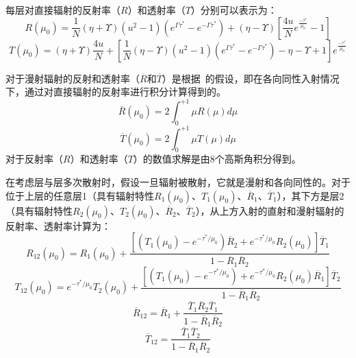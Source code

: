 每层对直接辐射的反射率（$R$）和透射率（$T$）分别可以表示为：
\begin{equation}
R\left( \mu_{0} \right) = \frac{1}{N}(\eta + \Upsilon)\left( u^{2} - 1 \right)\left( e^{\Gamma\tau^{*}} - e^{- \Gamma\tau^{*}} \right) + (\eta - \Upsilon)\left\lbrack \frac{4u}{N}e^{\frac{- \tau^{*}}{\mu_{0}}} - 1 \right\rbrack
\end{equation}
\begin{equation}
T\left( \mu_{0} \right) = (\eta + \Upsilon)\frac{4u}{N} + \left\lbrack \frac{1}{N}(\eta - \Upsilon)\left( u^{2} - 1 \right)\left( e^{\Gamma\tau^{*}} - e^{- \Gamma\tau^{*}} \right) - \eta - \Upsilon + 1 \right\rbrack e^{\frac{- \tau^{*}}{\mu_{0}}}
\end{equation}

对于漫射辐射的反射和透射率（\(\overline{R}\)和\(\overline{T}\)）是根据~\citet{wiscombe1980ModelSpectralAlbedo}的假设，即在各向同性入射情况下，通过对直接辐射的反射率进行积分计算得到的。
%
\begin{equation}
\overline{R}\left( \mu_{0} \right) = 2\int_{0}^{+ 1}{\mu R(\mu)d\mu}
\end{equation}
\begin{equation}
\overline{T}\left( \mu_{0} \right) = 2\int_{0}^{+ 1}{\mu T(\mu)d\mu}
\end{equation}
%
对于反射率（$R$）和透射率（$T$）的数值求解是由8个高斯角积分得到。

在考虑层与层多次散射时，假设一旦辐射被散射，它就是漫射和各向同性的。对于位于上层的任意层1（具有辐射特性\(R_{1}\left( \mu_{0} \right)\)、\(T_{1}\left( \mu_{0} \right)\)、\({\overline{R}}_{1}\)、\({\overline{T}}_{1}\)），其下方是层2（具有辐射特性\(R_{2}\left( \mu_{0} \right)\)、\(T_{2}\left( \mu_{0} \right)\)、\({\overline{R}}_{2}\)、\({\overline{T}}_{2}\)），从上方入射的直射和漫射辐射的反射率、透射率计算为\citep{briegleb2007delta}：
\begin{equation}
R_{12}\left( \mu_{0} \right) = R_{1}\left( \mu_{0} \right) + \frac{\left\lbrack \left( T_{1}\left( \mu_{0} \right) - e^{- \tau^{*}/\mu_{0}} \right){\overline{R}}_{2} + e^{- \tau^{*}/\mu_{0}}R_{2}\left( \mu_{0} \right) \right\rbrack{\overline{T}}_{1}}{1 - {\overline{R}}_{1}{\overline{R}}_{2}}
\end{equation}
\begin{equation}
T_{12}\left( \mu_{0} \right) = {e^{- \tau^{*}/\mu_{0}}T}_{2}\left( \mu_{0} \right) + \frac{\left\lbrack \left( T_{1}\left( \mu_{0} \right) - e^{- \tau^{*}/\mu_{0}} \right) + e^{- \tau^{*}/\mu_{0}}R_{2}\left( \mu_{0} \right){\overline{R}}_{1} \right\rbrack{\overline{T}}_{2}}{1 - {\overline{R}}_{1}{\overline{R}}_{2}}
\end{equation}
\begin{equation}
{\overline{R}}_{12} = {\overline{R}}_{1} + \frac{{\overline{T}}_{1}{\overline{R}}_{2}{\overline{T}}_{1}}{1 - {\overline{R}}_{1}{\overline{R}}_{2}}
\end{equation}
\begin{equation}
{\overline{T}}_{12} = \frac{{\overline{T}}_{1}{\overline{T}}_{2}}{1 - {\overline{R}}_{1}{\overline{R}}_{2}}
\end{equation}

